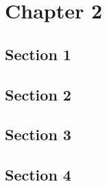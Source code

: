 \chapter{Chapter 2}
\label{cha:ch2}

\cite{REP04}


\section{Section 1}
\label{sec:ch2sec1}


\section{Section 2}
\label{sec:ch2sec2}


\section{Section 3}
\label{sec:ch2sec3}


\section{Section 4}
\label{sec:ch2sec4}
